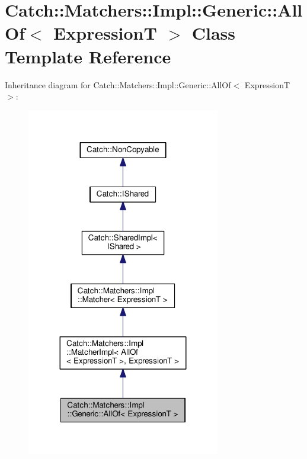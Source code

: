 \hypertarget{classCatch_1_1Matchers_1_1Impl_1_1Generic_1_1AllOf}{}\section{Catch\+:\+:Matchers\+:\+:Impl\+:\+:Generic\+:\+:All\+Of$<$ ExpressionT $>$ Class Template Reference}
\label{classCatch_1_1Matchers_1_1Impl_1_1Generic_1_1AllOf}


Inheritance diagram for Catch\+:\+:Matchers\+:\+:Impl\+:\+:Generic\+:\+:All\+Of$<$ ExpressionT $>$\+:
\nopagebreak
\begin{figure}[H]
\begin{center}
\leavevmode
\includegraphics[width=239pt]{classCatch_1_1Matchers_1_1Impl_1_1Generic_1_1AllOf__inherit__graph}
\end{center}
\end{figure}


